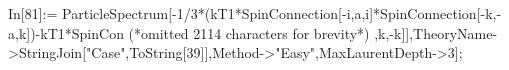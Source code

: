 In[81]:= ParticleSpectrum[-1/3*(kT1*SpinConnection[-i,a,i]*SpinConnection[-k,-a,k])-kT1*SpinCon (*omitted 2114 characters for brevity*) ,k,-k]],TheoryName->StringJoin["Case",ToString[39]],Method->"Easy",MaxLaurentDepth->3];